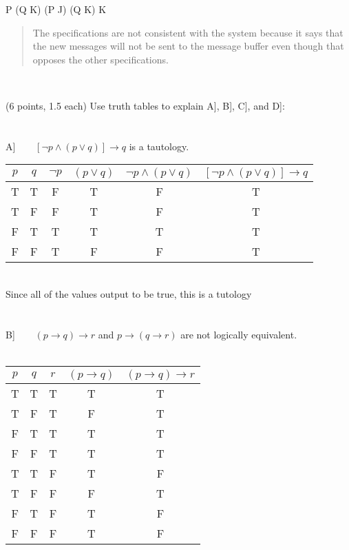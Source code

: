 \documentclass[9pt]{article}
\begin{document}
\lnot P \to (Q \land K) \land (\lnot P \iff J) \land (\lnot Q \to K) \land \lnot K

\begin{quote}
	The specifications are not consistent with the system because it says that the new messages will not be sent to the message buffer even though that opposes the other specifications.
\end{quote}

\\
\vspace{10mm}
\newpage
\vspace{5mm}
\item (6 points, 1.5 each) Use truth tables to explain A], B], C], and D]:\\
\\ \\
A] $\phantom{xxx}[\lnot p\land(p\lor q)]\to q$ is a tautology.\\
	\begin{tabular}{| c | c | c | c | c | c |}
	\hline
		$p$ & $q$ & $\lnot p$  & $(p\lor q)$  & $\lnot p\land(p\lor q)$ & $[\lnot p\land(p\lor q)]\to q$\\ \hline
		T & T & F & T & F & T\\ \hline
		T & F & F & T & F & T\\ \hline
		F & T & T & T & T & T\\ \hline
		F & F & T & F & F & T\\ \hline
	\end{tabular} \\ Since all of the values output to be true, this is a tutology\\
\\ \\
B] $\phantom{xxx}(p\to q)\to r$ and $p\to(q\to r)$ are not logically
equivalent.\\ \\
\begin{tabular}{| c | c | c | c | c |}
	\hline
		$p$ & $q$ & $r$ & $(p \to q)$  & $(p \to q) \to r$ \\ \hline
		T & T & T & T & T \\ \hline
		T & F & T & F & T\\ \hline
		F & T & T & T & T \\ \hline
		F & F & T & T & T\\ \hline
		T & T & F & T & F \\ \hline
		T & F & F & F & T \\ \hline
		F & T & F & T & F \\ \hline
		F & F & F & T & F\\ \hline
	\end{tabular}
\end{document}
